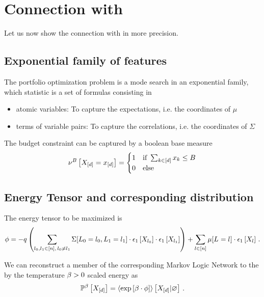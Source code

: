 \documentclass[aps,onecolumn,nofootinbib,pra]{article}
\begin{document}
    \section{Connection with \tnreason}

    Let us now show the connection with \tnreason in more precision.

    \subsection{Exponential family of features}

    The portfolio optimization problem is a mode search in an exponential family, which statistic is a set of formulas consisting in
    \begin{itemize}
        \item atomic variables: To capture the expectations, i.e. the coordinates of $\mu$
        \item terms of variable pairs: To capture the correlations, i.e. the coordinates of $\Sigma$
    \end{itemize}

    The budget constraint can be captured by a boolean base measure
    \begin{align*}
        \nu^{B}\left[X_{[d]}=x_{[d]}\right]
        =\begin{cases}
             1 & \text{if } \sum_{k\in[d]}x_{k} \leq B \\
             0 & \text{else}
        \end{cases}
    \end{align*}

    \subsection{Energy Tensor and corresponding distribution}

    The energy tensor to be maximized is
    \[ \phi = - q \left(\sum_{l_{0},l_{1}\in[n] , \, l_{0}\neq l_{1}}
    \Sigma[L_{0}=l_{0},L_{1}=l_{1}] \cdot \epsilon_{1}\left[X_{l_{0}}\right]\cdot \epsilon_{1}\left[X_{l_{1}}\right]\right)
    + \sum_{l\in[n]} \mu[L_{}=l_{}] \cdot \epsilon_{1}\left[X_{l}\right] \, . \]

    We can reconstruct a member of the corresponding Markov Logic Network to the by the temperature $\beta>0$ scaled energy as
    \begin{align*}
        \mathbb{P}^{\beta}\left[X_{[d]}\right] = \left\langle \mathrm{exp}\left[\beta\cdot\phi\right]\right\rangle \left[ X_{[d]} | \varnothing \right] \, .
    \end{align*}
\end{document}
